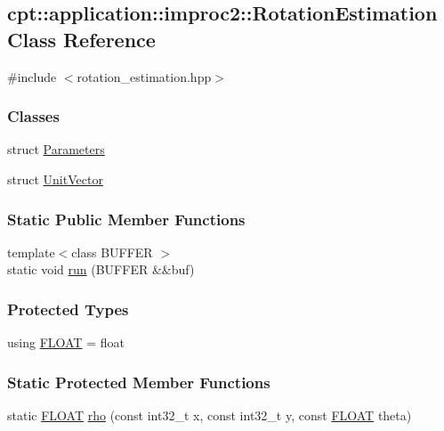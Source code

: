 \hypertarget{classcpt_1_1application_1_1improc2_1_1_rotation_estimation}{\subsection{cpt\-:\-:application\-:\-:improc2\-:\-:Rotation\-Estimation Class Reference}
\label{classcpt_1_1application_1_1improc2_1_1_rotation_estimation}
}


{\ttfamily \#include $<$rotation\-\_\-estimation.\-hpp$>$}

\subsubsection*{Classes}
\begin{DoxyCompactItemize}
\item 
struct \hyperlink{structcpt_1_1application_1_1improc2_1_1_rotation_estimation_1_1_parameters}{Parameters}
\item 
struct \hyperlink{structcpt_1_1application_1_1improc2_1_1_rotation_estimation_1_1_unit_vector}{Unit\-Vector}
\end{DoxyCompactItemize}
\subsubsection*{Static Public Member Functions}
\begin{DoxyCompactItemize}
\item 
{\footnotesize template$<$class B\-U\-F\-F\-E\-R $>$ }\\static void \hyperlink{classcpt_1_1application_1_1improc2_1_1_rotation_estimation_a7809f57c1df3a40d12378579222934b0}{run} (B\-U\-F\-F\-E\-R \&\&buf)
\end{DoxyCompactItemize}
\subsubsection*{Protected Types}
\begin{DoxyCompactItemize}
\item 
using \hyperlink{classcpt_1_1application_1_1improc2_1_1_rotation_estimation_a7169f80f99e5e3ef37a3e8d4a69d9b11}{F\-L\-O\-A\-T} = float
\end{DoxyCompactItemize}
\subsubsection*{Static Protected Member Functions}
\begin{DoxyCompactItemize}
\item 
static \hyperlink{classcpt_1_1application_1_1improc2_1_1_rotation_estimation_a7169f80f99e5e3ef37a3e8d4a69d9b11}{F\-L\-O\-A\-T} \hyperlink{classcpt_1_1application_1_1improc2_1_1_rotation_estimation_acde14f3d1abda4e18059466a090abbff}{rho} (const int32\-\_\-t x, const int32\-\_\-t y, const \hyperlink{classcpt_1_1application_1_1improc2_1_1_rotation_estimation_a7169f80f99e5e3ef37a3e8d4a69d9b11}{F\-L\-O\-A\-T} theta)
\end{DoxyCompactItemize}


